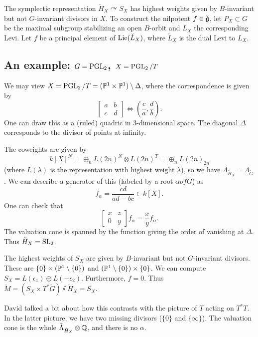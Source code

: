 \documentclass{article}
\begin{document}
The symplectic representation $\check{H}_X \curvearrowright S_X$ has highest weights given by $B$-invariant but not $G$-invariant divisors in $X$.
To construct the nilpotent $f \in \check{\mathfrak{g}}$, let $P_X \subset G$ be the maximal subgroup stabilizing an open $B$-orbit and $L_X$ the corresponding Levi.
Let $f$ be a principal element of $\operatorname{Lie}(\check{L}_X)$, where $\check{L}_X$ is the dual Levi to $L_X$.

\subsection{An example: $G = \operatorname{PGL}_2$, $X = \operatorname{PGL}_2 / T$}

We may view $X = \operatorname{PGL}_2 / T = (\mathbb{P}^1 \times \mathbb{P}^1) \setminus \Delta$, where the correspondence is given by
\[
	\begin{bmatrix}
		a & b \\
		c & d
	\end{bmatrix} \Leftrightarrow \left(\frac{c}{a}, \frac{d}{b}\right).
\]
One can draw this as a (ruled) quadric in $3$-dimensional space.
The diagonal $\Delta$ corresponds to the divisor of points at infinity.

The coweights are given by
\[
	k[X]^N = \oplus_n L(2n)^N \otimes L(2n)^T = \oplus_n L(2n)_{2n}
\]
(where $L(\lambda)$ is the representation with highest weight $\lambda$), so we have $\Lambda_{\check{H}_X} = \Lambda_{\check{G}}$.
We can describe a generator of this (labeled by a root $\alpha of \check{G}$) as
\[
	f_\alpha = \frac{cd}{ad - bc} \in k[X].
\]
One can check that
\[
	\begin{bmatrix}
		x & z \\
		0 & y
	\end{bmatrix} f_\alpha = \frac{x}{y} f_\alpha.
\]
The valuation cone is spanned by the function giving the order of vanishing at $\Delta$.
Thus $\check{H}_X = \operatorname{SL}_2$.

The highest weights of $S_X$ are given by $B$-invariant but not $G$-invariant divisors.
These are $\{0\} \times (\mathbb{P}^1 \setminus \{0\})$ and $(\mathbb{P}^1 \setminus \{0\}) \times \{0\}$.
We can compute $S_X = L(\epsilon_1) \oplus L(-\epsilon_2)$.
Furthermore, $f = 0$.
Thus $\check{M} = (S_X \times T^* \check{G}) \sslash \check{H}_X = S_X$.

David talked a bit about how this contrasts with the picture of $T$ acting on $T^*T$.
In the latter picture, we have two missing divisors ($\{0\}$ and $\{\infty\}$).
The valuation cone is the whole $\check{\Lambda}_{\check{H}_X} \otimes \mathbb{Q}$, and there is no $\alpha$.
\end{document}
